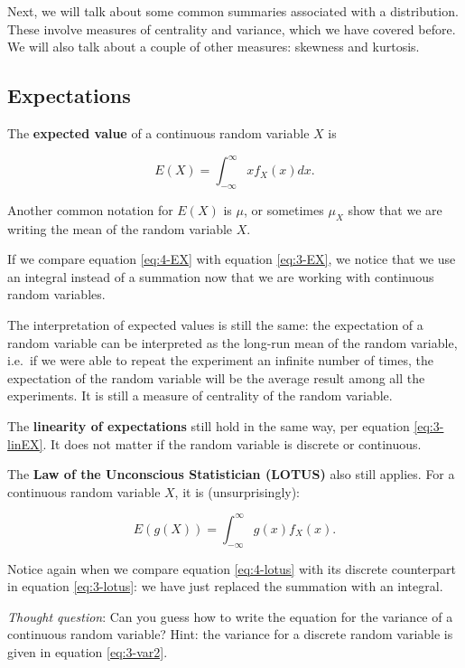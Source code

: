 \documentclass[
]{book}
\begin{document}
Next, we will talk about some common summaries associated with a distribution. These involve measures of centrality and variance, which we have covered before. We will also talk about a couple of other measures: skewness and kurtosis.

\subsection{Expectations}\label{expectations-1}

The \textbf{expected value} of a continuous random variable \(X\) is

\begin{equation} 
E(X) = \int_{-\infty}^{\infty} x f_X(x) dx.
\label{eq:4-EX}
\end{equation}

Another common notation for \(E(X)\) is \(\mu\), or sometimes \(\mu_X\) show that we are writing the mean of the random variable \(X\).

If we compare equation \eqref{eq:4-EX} with equation \eqref{eq:3-EX}, we notice that we use an integral instead of a summation now that we are working with continuous random variables.

The interpretation of expected values is still the same: the expectation of a random variable can be interpreted as the long-run mean of the random variable, i.e.~if we were able to repeat the experiment an infinite number of times, the expectation of the random variable will be the average result among all the experiments. It is still a measure of centrality of the random variable.

The \textbf{linearity of expectations} still hold in the same way, per equation \eqref{eq:3-linEX}. It does not matter if the random variable is discrete or continuous.

The \textbf{Law of the Unconscious Statistician (LOTUS)} also still applies. For a continuous random variable \(X\), it is (unsurprisingly):

\begin{equation} 
E(g(X)) = \int_{-\infty}^{\infty} g(x) f_X(x).
\label{eq:4-lotus}
\end{equation}

Notice again when we compare equation \eqref{eq:4-lotus} with its discrete counterpart in equation \eqref{eq:3-lotus}: we have just replaced the summation with an integral.

\emph{Thought question}: Can you guess how to write the equation for the variance of a continuous random variable? Hint: the variance for a discrete random variable is given in equation \eqref{eq:3-var2}.
\end{document}
